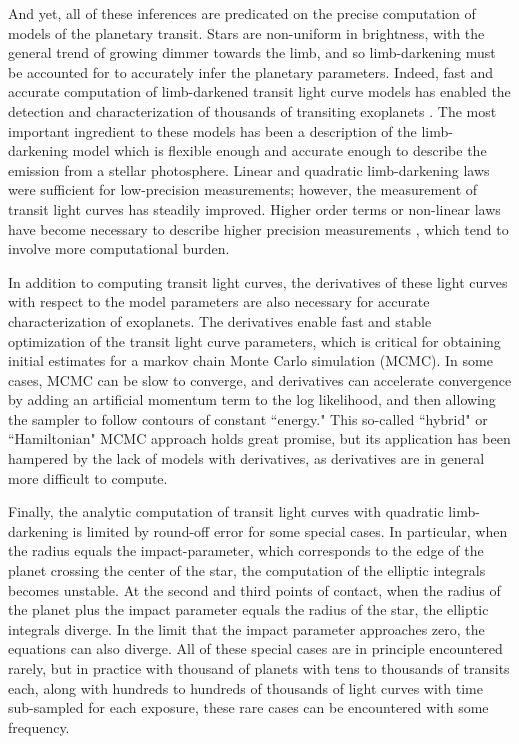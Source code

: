 \documentclass[modern]{aastex61}
\begin{document}
And yet, all of these inferences are predicated on the precise computation of models 
of the planetary transit.  Stars are non-uniform in brightness, with the general
trend of growing dimmer towards the limb, and so limb-darkening must be accounted
for to accurately infer the planetary parameters.  Indeed, fast and accurate computation 
of limb-darkened transit light curve models has enabled the detection and 
characterization of thousands of transiting exoplanets \citep{MandelAgol2002}.
The most important ingredient to these models has been a description of the
limb-darkening model which is flexible enough and accurate enough to describe the 
emission from a stellar photosphere.  Linear and quadratic limb-darkening laws
were sufficient for low-precision measurements; however, the measurement of
transit light curves has steadily improved.  Higher order terms or non-linear laws 
have become necessary to describe higher precision measurements \citep{Claret2000,
Gimenez2006}, which tend to involve more computational burden.

In addition to computing transit light curves, the derivatives of these light
curves with respect to the model parameters are also necessary for accurate
characterization of exoplanets.   The derivatives enable fast and stable
optimization of the transit light curve parameters, which is critical for
obtaining initial estimates for a markov chain Monte Carlo simulation (MCMC).
In some cases, MCMC can be slow to converge, and derivatives can accelerate
convergence by adding an artificial momentum term to the log likelihood,
and then allowing the sampler to follow contours of constant ``energy."
This so-called ``hybrid" or ``Hamiltonian" MCMC approach holds great promise,
but its application has been hampered by the lack of models with derivatives,
as derivatives are in general more difficult to compute.

Finally, the analytic computation of transit light curves with quadratic
limb-darkening is limited by round-off error for some special cases.  In 
particular, when the radius equals the impact-parameter, which corresponds to 
the edge of the planet crossing the center of the star, the computation of the 
elliptic integrals becomes unstable.  At the second and third points of
contact, when the radius of the planet plus the impact parameter equals
the radius of the star, the elliptic integrals diverge.  In the
limit that the impact parameter approaches zero, the equations can also
diverge.  All of these special cases are in principle encountered rarely,
but in practice with thousand of planets with tens to thousands of
transits each, along with hundreds to hundreds of thousands of light
curves with time sub-sampled for each exposure, these rare cases can
be encountered with some frequency.
\end{document}
